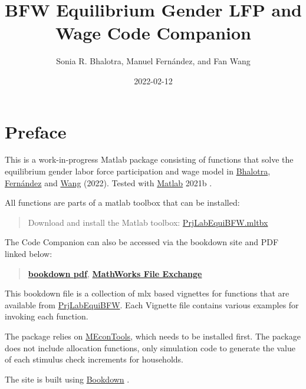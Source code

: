 \documentclass[
]{book}
\title{BFW Equilibrium Gender LFP and Wage Code Companion}
\author{Sonia R. Bhalotra, Manuel Fernández, and Fan Wang}
\date{2022-02-12}
\begin{document}
\maketitle

{
\hypersetup{linkcolor=}
\setcounter{tocdepth}{1}
\tableofcontents
}
\hypertarget{preface}{%
\chapter*{Preface}\label{preface}}

This is a work-in-progress Matlab package consisting of functions that solve the equilibrium gender labor force participation and wage model in \href{https://www.iza.org/person/2905/sonia-r-bhalotra}{Bhalotra}, \href{https://sites.google.com/view/manuelfernandezsierra}{Fernández} and \href{https://fanwangecon.github.io/}{Wang} (2022). Tested with \href{https://www.mathworks.com/products/matlab.html}{Matlab} 2021b \citep{matlab}.

All functions are parts of a matlab toolbox that can be installed:

\begin{quote}
Download and install the Matlab toolbox: \href{https://github.com/FanWangEcon/PrjLabEquiBFW/blob/master/PrjLabEquiBFW.mltbx}{PrjLabEquiBFW.mltbx}
\end{quote}

The Code Companion can also be accessed via the bookdown site and PDF linked below:

\begin{quote}
\href{https://fanwangecon.github.io/PrjLabEquiBFW/bookdown/BFW-Equilibrium-Gender-LFP-and-Wage-Code-Companion.pdf}{\textbf{bookdown pdf}}, \href{https://www.mathworks.com/matlabcentral/fileexchange/80164-PrjLabEquiBFW}{\textbf{MathWorks File Exchange}}
\end{quote}

This bookdown file is a collection of mlx based vignettes for functions that are available from \href{https://github.com/FanWangEcon/PrjLabEquiBFW}{PrjLabEquiBFW}. Each Vignette file contains various examples for invoking each function.

The package relies on \href{https://fanwangecon.github.io/MEconTools/}{MEconTools}, which needs to be installed first. The package does not include allocation functions, only simulation code to generate the value of each stimulus check increments for households.

The site is built using \href{https://bookdown.org/}{Bookdown} \citep{R-bookdown}.
\end{document}
